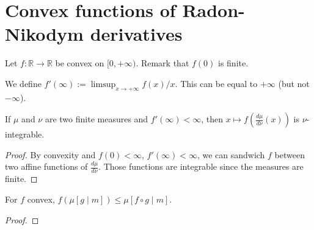 \chapter{Convex functions of Radon-Nikodym derivatives}

Let $f : \mathbb{R} \to \mathbb{R}$ be convex on $[0, +\infty)$. Remark that $f(0)$ is finite.

\begin{definition}
  \label{def:derivAtTop}
  \leanok
  We define $f'(\infty) := \limsup_{x \to + \infty} f(x)/x$. This can be equal to $+\infty$ (but not $-\infty$).
\end{definition}

\begin{lemma}
  \label{lem:integrable_f_rnDeriv_of_derivAtTop_ne_top}
  \leanok
  If $\mu$ and $\nu$ are two finite measures and $f'(\infty) < \infty$, then $x \mapsto f\left(\frac{d\mu}{d\nu}(x)\right)$ is $\nu$-integrable. 
\end{lemma}

\begin{proof} \leanok
By convexity and $f(0) < \infty$, $f'(\infty)<\infty$, we can sandwich $f$ between two affine functions of $\frac{d\mu}{d\nu}$.
Those functions are integrable since the measures are finite.
\end{proof}

\begin{theorem}
  \label{thm:condexp_jensen}
  For $f$ convex, $f\left(\mu [g \mid m]\right) \le \mu [f \circ g \mid m]$.
\end{theorem}

\begin{proof}
\end{proof}